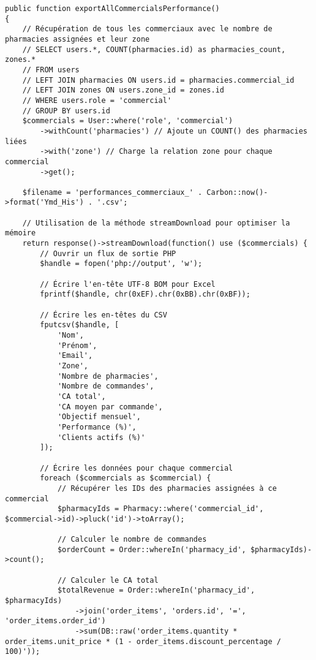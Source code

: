 \documentclass[12pt,a4paper]{article}
\begin{document}
\begin{lstlisting}[caption=Méthode exportAllCommercialsPerformance]
public function exportAllCommercialsPerformance()
{
    // Récupération de tous les commerciaux avec le nombre de pharmacies assignées et leur zone
    // SELECT users.*, COUNT(pharmacies.id) as pharmacies_count, zones.*
    // FROM users
    // LEFT JOIN pharmacies ON users.id = pharmacies.commercial_id
    // LEFT JOIN zones ON users.zone_id = zones.id
    // WHERE users.role = 'commercial'
    // GROUP BY users.id
    $commercials = User::where('role', 'commercial')
        ->withCount('pharmacies') // Ajoute un COUNT() des pharmacies liées
        ->with('zone') // Charge la relation zone pour chaque commercial
        ->get();
    
    $filename = 'performances_commerciaux_' . Carbon::now()->format('Ymd_His') . '.csv';
    
    // Utilisation de la méthode streamDownload pour optimiser la mémoire
    return response()->streamDownload(function() use ($commercials) {
        // Ouvrir un flux de sortie PHP
        $handle = fopen('php://output', 'w');
        
        // Écrire l'en-tête UTF-8 BOM pour Excel
        fprintf($handle, chr(0xEF).chr(0xBB).chr(0xBF));
        
        // Écrire les en-têtes du CSV
        fputcsv($handle, [
            'Nom',
            'Prénom',
            'Email',
            'Zone',
            'Nombre de pharmacies',
            'Nombre de commandes',
            'CA total',
            'CA moyen par commande',
            'Objectif mensuel',
            'Performance (%)',
            'Clients actifs (%)'
        ]);
        
        // Écrire les données pour chaque commercial
        foreach ($commercials as $commercial) {
            // Récupérer les IDs des pharmacies assignées à ce commercial
            $pharmacyIds = Pharmacy::where('commercial_id', $commercial->id)->pluck('id')->toArray();
            
            // Calculer le nombre de commandes
            $orderCount = Order::whereIn('pharmacy_id', $pharmacyIds)->count();
            
            // Calculer le CA total
            $totalRevenue = Order::whereIn('pharmacy_id', $pharmacyIds)
                ->join('order_items', 'orders.id', '=', 'order_items.order_id')
                ->sum(DB::raw('order_items.quantity * order_items.unit_price * (1 - order_items.discount_percentage / 100)'));
            

\end{lstlisting}
\end{document}

